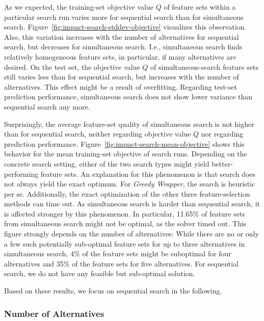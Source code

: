 \documentclass[conference]{IEEEtran}
\theoremstyle{definition}
\begin{document}
As we expected, the training-set objective value $Q$ of feature sets within a particular search run varies more for sequential search than for simultaneous search.
Figure~\ref{fig:impact-search-stddev-objective} visualizes this observation.
Also, this variation increases with the number of alternatives for sequential search, but decreases for simultaneous search.
I.e., simultaneous search finds relatively homogeneous feature sets, in particular, if many alternatives are desired.
On the test set, the objective value $Q$ of simultaneous-search feature sets still varies less than for sequential search, but increases with the number of alternatives.
This effect might be a result of overfitting.
Regarding test-set prediction performance, simultaneous search does not show lower variance than sequential search any more.

Surprisingly, the average feature-set quality of simultaneous search is not higher than for sequential search, neither regarding objective value $Q$ nor regarding prediction performance.
Figure~\ref{fig:impact-search-mean-objective} shows this behavior for the mean training-set objective of search runs.
Depending on the concrete search setting, either of the two search types might yield better-performing feature sets.
An explanation for this phenomenon is that search does not always yield the exact optimum.
For \emph{Greedy Wrapper}, the search is heuristic per se.
Additionally, the exact optimization of the other three feature-selection methods can time out.
As simultaneous search is harder than sequential search, it is affected stronger by this phenomenon.
In particular, 11.65\% of feature sets from simultaneous search might not be optimal, as the solver timed out.
This figure strongly depends on the number of alternatives:
While there are no or only a few such potentially sub-optimal feature sets for up to three alternatives in simultaneous search, 4\% of the feature sets might be suboptimal for four alternatives and 35\% of the feature sets for five alternatives.
For sequential search, we do not have any feasible but sub-optimal solution.

Based on these results, we focus on sequential search in the following.

\subsubsection{Number of Alternatives}
\end{document}
